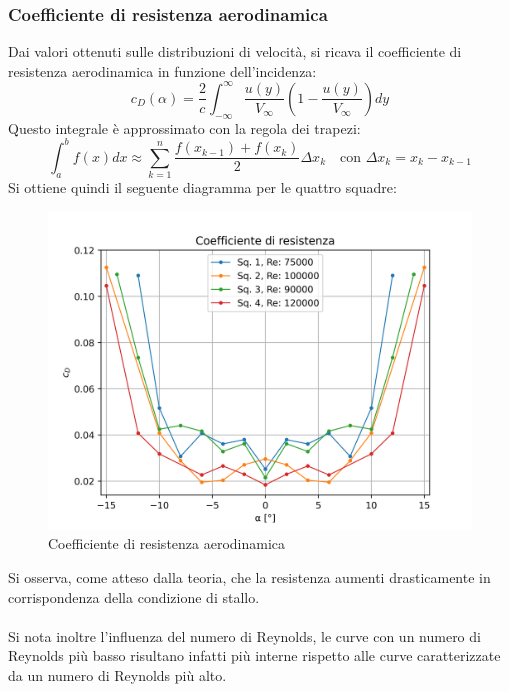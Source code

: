 \subsubsection{Coefficiente di resistenza aerodinamica}
Dai valori ottenuti sulle distribuzioni di velocità, si ricava il coefficiente di resistenza aerodinamica in funzione dell'incidenza:
\begin{equation*}
    c_D(\alpha) = \frac 2c \int_{-\infty}^\infty \frac{u(y)}{V_\infty}\left(1-\frac{u(y)}{V_\infty}\right)dy
\end{equation*}
Questo integrale è approssimato con la regola dei trapezi:
\begin{equation*}
    \int_a^b f(x)dx \approx \sum_{k=1}^n \frac{f(x_{k-1}) + f(x_k)}2 \Delta x_k \quad \text{con } \Delta x_k = x_k - x_{k-1}
\end{equation*}
Si ottiene quindi il seguente diagramma per le quattro squadre:
\begin{figure}[H]
    \centering
    \includegraphics[width=.8\textwidth]{images/6/cd.png}
    \caption{Coefficiente di resistenza aerodinamica}
\end{figure}

\noindent Si osserva, come atteso dalla teoria, che la resistenza aumenti drasticamente in corrispondenza della condizione di stallo.\\\\
Si nota inoltre l'influenza del numero di Reynolds, le curve con un numero di Reynolds più basso risultano infatti più interne rispetto alle curve caratterizzate da un numero di Reynolds più alto.
\newpage
